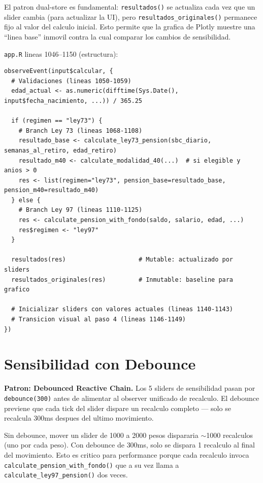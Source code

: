 \documentclass[11pt, letterpaper, twoside]{report}
\begin{document}
\begin{intuicionbox}
El patron dual-store es fundamental: \texttt{resultados()} se actualiza cada vez
que un slider cambia (para actualizar la UI), pero \texttt{resultados\_originales()}
permanece fijo al valor del calculo inicial. Esto permite que la grafica de Plotly
muestre una ``linea base'' inmovil contra la cual comparar los cambios de sensibilidad.
\end{intuicionbox}

\begin{codigobox}
\texttt{app.R} lineas 1046--1150 (estructura):
\begin{lstlisting}[caption={Dispatch principal de calculo}]
observeEvent(input$calcular, {
  # Validaciones (lineas 1050-1059)
  edad_actual <- as.numeric(difftime(Sys.Date(), input$fecha_nacimiento, ...)) / 365.25

  if (regimen == "ley73") {
    # Branch Ley 73 (lineas 1068-1108)
    resultado_base <- calculate_ley73_pension(sbc_diario, semanas_al_retiro, edad_retiro)
    resultado_m40 <- calculate_modalidad_40(...)  # si elegible y anios > 0
    res <- list(regimen="ley73", pension_base=resultado_base, pension_m40=resultado_m40)
  } else {
    # Branch Ley 97 (lineas 1110-1125)
    res <- calculate_pension_with_fondo(saldo, salario, edad, ...)
    res$regimen <- "ley97"
  }

  resultados(res)                    # Mutable: actualizado por sliders
  resultados_originales(res)         # Inmutable: baseline para grafico

  # Inicializar sliders con valores actuales (lineas 1140-1143)
  # Transicion visual al paso 4 (lineas 1146-1149)
})
\end{lstlisting}
\end{codigobox}


\section{Sensibilidad con Debounce}
\label{sec:sensibilidad}

\begin{patronbox}
\textbf{Patron: Debounced Reactive Chain.} Los 5 sliders de sensibilidad pasan
por \texttt{debounce(300)} antes de alimentar al observer unificado de recalculo.
El debounce previene que cada tick del slider dispare un recalculo completo ---
solo se recalcula 300ms despues del ultimo movimiento.
\end{patronbox}

\begin{intuicionbox}
Sin debounce, mover un slider de 1000 a 2000 pesos dispararia $\sim$1000
recalculos (uno por cada peso). Con debounce de 300ms, solo se dispara 1 recalculo
al final del movimiento. Esto es critico para performance porque cada recalculo
invoca \texttt{calculate\_pension\_with\_fondo()} que a su vez llama a
\texttt{calculate\_ley97\_pension()} dos veces.
\end{intuicionbox}
\end{document}
